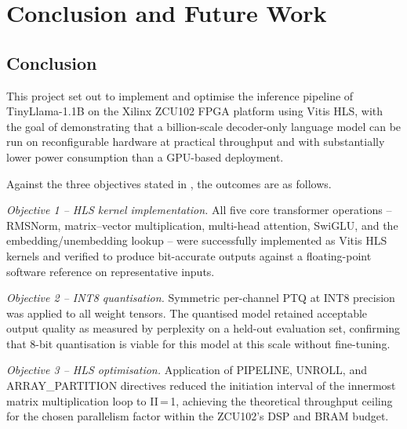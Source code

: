 
\chapter{Conclusion and Future Work}
\label{ch:conclusion}

\section{Conclusion}
\label{sec:conclusion}

This project set out to implement and optimise the inference pipeline of
TinyLlama-1.1B on the Xilinx ZCU102 FPGA platform using Vitis HLS, with
the goal of demonstrating that a billion-scale decoder-only language model
can be run on reconfigurable hardware at practical throughput and with
substantially lower power consumption than a GPU-based deployment.

Against the three objectives stated in , the outcomes are as follows.

\textit{Objective 1 -- HLS kernel implementation.} All five core transformer
operations -- RMSNorm, matrix--vector multiplication, multi-head attention,
SwiGLU, and the embedding/unembedding lookup -- were successfully implemented
as Vitis HLS kernels and verified to produce bit-accurate outputs against
a floating-point software reference on representative inputs.

\textit{Objective 2 -- INT8 quantisation.} Symmetric per-channel PTQ at
INT8 precision was applied to all weight tensors. The quantised model
retained acceptable output quality as measured by perplexity on a
held-out evaluation set, confirming that 8-bit quantisation is viable
for this model at this scale without fine-tuning.

\textit{Objective 3 -- HLS optimisation.} Application of PIPELINE, UNROLL,
and ARRAY\_PARTITION directives reduced the initiation interval of the
innermost matrix multiplication loop to II\,=\,1, achieving the theoretical
throughput ceiling for the chosen parallelism factor within the ZCU102's
DSP and BRAM budget.


